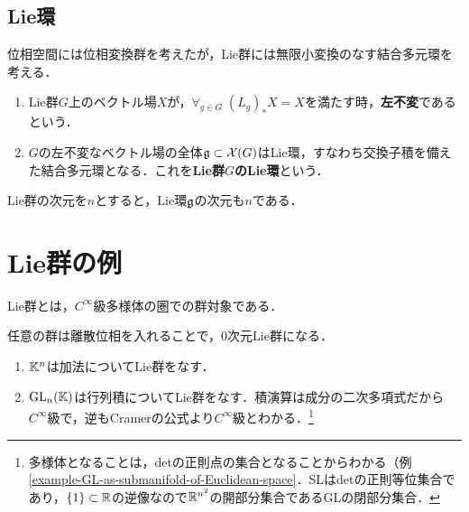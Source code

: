 \documentclass[uplatex,dvipdfmx]{jsreport}
\begin{document}
\subsection{Lie環}

\begin{tcolorbox}[colframe=ForestGreen, colback=ForestGreen!10!white,breakable,colbacktitle=ForestGreen!40!white,coltitle=black,fonttitle=\bfseries\sffamily,
title=]
    位相空間には位相変換群を考えたが，Lie群には無限小変換のなす結合多元環を考える．
\end{tcolorbox}

\begin{definition}\mbox{}
    \begin{enumerate}
        \item Lie群$G$上のベクトル場$X$が，$\forall_{g\in G}\;(L_g)_*X=X$を満たす時，\textbf{左不変}であるという．
        \item $G$の左不変なベクトル場の全体$\mathfrak{g}\subset\mathcal{X}(G)$はLie環，すなわち交換子積を備えた結合多元環となる．これを\textbf{Lie群$G$のLie環}という．
    \end{enumerate}
\end{definition}

\begin{theorem}
    Lie群の次元を$n$とすると，Lie環$\mathfrak{g}$の次元も$n$である．
\end{theorem}

\section{Lie群の例}

\begin{tcolorbox}[colframe=ForestGreen, colback=ForestGreen!10!white,breakable,colbacktitle=ForestGreen!40!white,coltitle=black,fonttitle=\bfseries\sffamily,
title=]
    Lie群とは，$C^\infty$級多様体の圏での群対象である．
\end{tcolorbox}

\begin{remark}
    任意の群は離散位相を入れることで，$0$次元Lie群になる．
\end{remark}

\begin{example}\mbox{}
    \begin{enumerate}
        \item $\mathbb{K}^n$は加法についてLie群をなす．
        \item $\mathrm{GL}_n(\mathbb{K})$は行列積についてLie群をなす．積演算は成分の二次多項式だから$C^\infty$級で，逆もCramerの公式より$C^\infty$級とわかる．\footnote{多様体となることは，detの正則点の集合となることからわかる（例\ref{example-GL-as-submanifold-of-Euclidean-space}．SLはdetの正則等位集合であり，$\{1\}\subset\mathbb{R}$の逆像なので$\mathbb{R}^{n^2}$の開部分集合であるGLの閉部分集合．}
    \end{enumerate}
\end{example}
\end{document}
